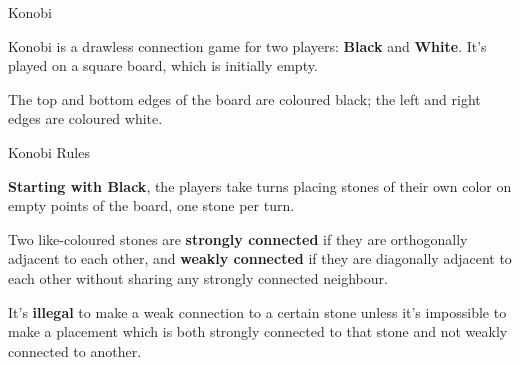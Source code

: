 \documentclass{beamer}
\begin{document}
  \begin{frame}{Konobi}

    Konobi is a drawless connection game for two players: \textbf{Black}
    and \textbf{White}. It's played on a square board, which is initially empty. 

    \vspace{1em}

    The top and bottom edges of the board are coloured black; the left and right edges are coloured white.

    \vspace{1em}

    \begin{centering}


    \end{centering}

  \end{frame}



  \begin{frame}{Konobi Rules}

    \textbf{Starting with Black}, the players take turns placing stones of their own color on empty points of the board, one stone per turn.\pause

    \vspace{1em}

    Two like-coloured stones are \textbf{strongly connected} if they are orthogonally adjacent to each other, and \textbf{weakly connected} if they are diagonally adjacent to each other without sharing any strongly connected neighbour.\pause

    \vspace{1em}

    It's \textbf{illegal} to make a weak connection to a certain stone unless it's impossible to make a placement which is both strongly connected to that stone and not weakly connected to another.

  \end{frame}
\end{document}

